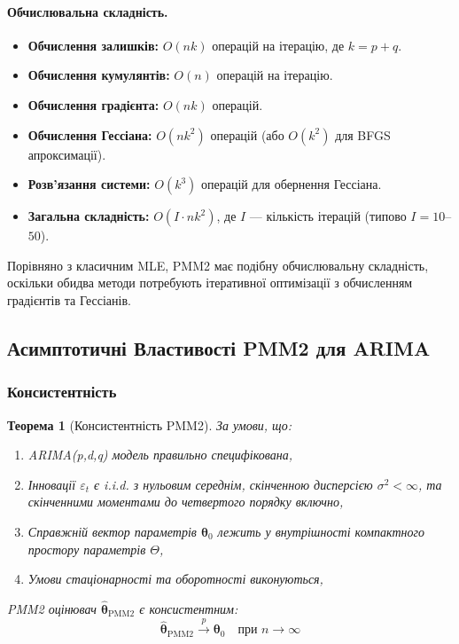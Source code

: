 \documentclass[12pt,a4paper]{article}
\newtheorem{theorem}{Теорема}[section]
\begin{document}
	\paragraph{Обчислювальна складність.}
	
	\begin{itemize}
		\item \textbf{Обчислення залишків:} $O(nk)$ операцій на ітерацію, де $k = p + q$.
		
		\item \textbf{Обчислення кумулянтів:} $O(n)$ операцій на ітерацію.
		
		\item \textbf{Обчислення градієнта:} $O(nk)$ операцій.
		
		\item \textbf{Обчислення Гессіана:} $O(nk^2)$ операцій (або $O(k^2)$ для BFGS апроксимації).
		
		\item \textbf{Розв'язання системи:} $O(k^3)$ операцій для обернення Гессіана.
		
		\item \textbf{Загальна складність:} $O(I \cdot nk^2)$, де $I$ --- кількість ітерацій (типово $I = 10$--$50$).
	\end{itemize}
	
	Порівняно з класичним MLE, PMM2 має подібну обчислювальну складність, оскільки обидва методи потребують ітеративної оптимізації з обчисленням градієнтів та Гессіанів.
	
	\subsection{Асимптотичні Властивості PMM2 для ARIMA}
	\label{subsec:asymptotic_theory}
	
	\subsubsection{Консистентність}
	
	\begin{theorem}[Консистентність PMM2]
		\label{thm:consistency}
		За умови, що:
		\begin{enumerate}
			\item ARIMA(p,d,q) модель правильно специфікована,
			\item Інновації $\varepsilon_t$ є i.i.d. з нульовим середнім, скінченною дисперсією $\sigma^2 < \infty$, та скінченними моментами до четвертого порядку включно,
			\item Справжній вектор параметрів $\boldsymbol{\theta}_0$ лежить у внутрішності компактного простору параметрів $\Theta$,
			\item Умови стаціонарності та оборотності виконуються,
		\end{enumerate}
		PMM2 оцінювач $\hat{\boldsymbol{\theta}}_{\text{PMM2}}$ є консистентним:
		\begin{equation}
			\label{eq:consistency}
			\hat{\boldsymbol{\theta}}_{\text{PMM2}} \xrightarrow{p} \boldsymbol{\theta}_0 \quad \text{при } n \to \infty
		\end{equation}
	\end{theorem}
	
\end{document}
